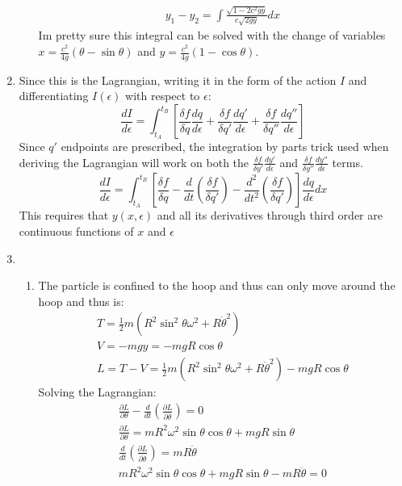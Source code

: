 \documentclass[12pt]{article}
\newcommand{\p}[2]{\frac{\partial #1}{\partial #2}}
\newcommand{\der}[2]{\frac{d #1}{d #2}}
\begin{document}
\begin{enumerate}
\begin{enumerate}
      \begin{gather*}
        y_1-y_2=\int \frac{\sqrt{1-2c^2 gy}}{c\sqrt{2gy}}dx
      \end{gather*}
      Im pretty sure this integral can be solved with the change of variables $x=\frac{c^2}{4g}(\theta-\sin\theta)$ and $y=\frac{c^2}{4g}\left( 1-\cos\theta \right)$.
    \end{enumerate}
    \item Since this is the Lagrangian, writing it in the form of the action $I$ and differentiating $I(\epsilon)$ with respect to $\epsilon$:
    \[
      \frac{dI}{d\epsilon}=\int_{t_A}^{t_B}\left[\frac{\delta f}{\delta q}\frac{dq}{d\epsilon}+\frac{\delta f}{\delta q'}\frac{dq'}{d\epsilon}+\frac{\delta f}{\delta q''}\frac{dq''}{d\epsilon}\right]
    \]
    Since $q'$ endpoints are prescribed, the integration by parts trick used when deriving the Lagrangian will work on both the $\frac{\delta f}{\delta y'}\frac{dy'}{d\epsilon}$ and $\frac{\delta f}{\delta y''}\frac{dy''}{d\epsilon}$ terms.
    \[
      \frac{dI}{d\epsilon}=\int_{t_A}^{t_B}\left[\frac{\delta f}{\delta q}-\frac{d}{dt}\left(\frac{\delta f}{\delta q'}\right)-\frac{d^2}{dt^2}\left(\frac{\delta f}{\delta q'}\right)\right]\frac{dq}{d\epsilon}dx
    \]
    This requires that $y(x,\epsilon)$ and all its derivatives through third order are continuous functions of $x$ and $\epsilon$
    \item
    \begin{enumerate}
      \item The particle is confined to the hoop and thus can only move around the hoop and thus is:
      \begin{gather*}
        T=\frac{1}{2}m\left( R^2\sin^2\theta\omega^2+R\dot{\theta}^2 \right)\\
        V=-mgy=-mgR\cos\theta\\
        L=T-V=\frac{1}{2}m\left( R^2\sin^2\theta\omega^2+R\dot{\theta}^2 \right)-mgR\cos\theta
      \end{gather*}
      Solving the Lagrangian:
      \begin{gather*}
        \p{L}{\theta}-\der{}{t}\left( \p{L}{\dot{\theta}} \right)=0\\
        \p{L}{\theta}=mR^2 \omega^2\sin\theta\cos\theta+mgR\sin\theta\\
        \der{}{t}\left( \p{L}{\dot{\theta}} \right)=mR\ddot{\theta}\\
        mR^2 \omega^2\sin\theta\cos\theta+mgR\sin\theta-mR\ddot{\theta}=0\\

\end{gather*}
\end{enumerate}
\end{enumerate}
\end{document}
